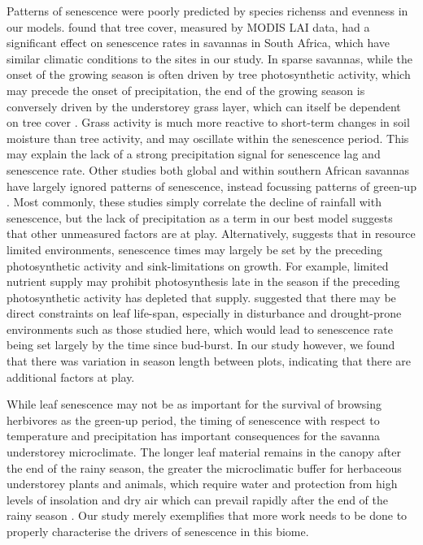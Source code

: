 \documentclass[11pt,a4paper]{article}
\begin{document}
Patterns of senescence were poorly predicted by species richenss and evenness in our models. \citet{Cho2017} found that tree cover, measured by MODIS LAI data, had a significant effect on senescence rates in savannas in South Africa, which have similar climatic conditions to the sites in our study. In sparse savannas, while the onset of the growing season is often driven by tree photosynthetic activity, which may precede the onset of precipitation, the end of the growing season is conversely driven by the understorey grass layer, which can itself be dependent on tree cover \citep{Cho2017, Guan2014}. Grass activity is much more reactive to short-term changes in soil moisture than tree activity, and may oscillate within the senescence period. This may explain the lack of a strong precipitation signal for senescence lag and senescence rate. Other studies both global and within southern African savannas have largely ignored patterns of senescence, instead focussing patterns of green-up \citep{Gallinat2015}. Most commonly, these studies simply correlate the decline of rainfall with senescence, but the lack of precipitation as a term in our best model suggests that other unmeasured factors are at play. Alternatively, \citet{Zani2020} suggests that in resource limited environments, senescence times may largely be set by the preceding photosynthetic activity and sink-limitations on growth. For example, limited nutrient supply may prohibit photosynthesis late in the season if the preceding photosynthetic activity has depleted that supply. \citet{Reich1992} suggested that there may be direct constraints on leaf life-span, especially in disturbance and drought-prone environments such as those studied here, which would lead to senescence rate being set largely by the time since bud-burst. In our study however, we found that there was variation in season length between plots, indicating that there are additional factors at play. 

While leaf senescence may not be as important for the survival of browsing herbivores as the green-up period, the timing of senescence with respect to temperature and precipitation has important consequences for the savanna understorey microclimate. The longer leaf material remains in the canopy after the end of the rainy season, the greater the microclimatic buffer for herbaceous understorey plants and animals, which require water and protection from high levels of insolation and dry air which can prevail rapidly after the end of the rainy season \citep{Guan2014}. Our study merely exemplifies that more work needs to be done to properly characterise the drivers of senescence in this biome.
\end{document}
